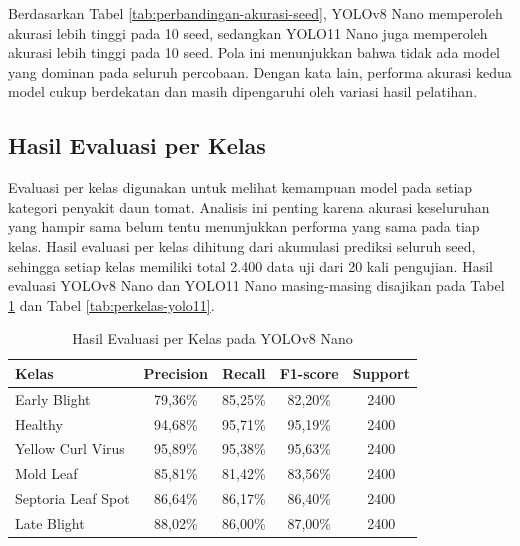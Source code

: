 \begin{sectioncontent}
\begin{subsectioncontent}
        Berdasarkan Tabel \ref{tab:perbandingan-akurasi-seed}, YOLOv8 Nano memperoleh akurasi lebih tinggi pada 10 seed, sedangkan YOLO11 Nano juga memperoleh akurasi lebih tinggi pada 10 seed. Pola ini menunjukkan bahwa tidak ada model yang dominan pada seluruh percobaan. Dengan kata lain, performa akurasi kedua model cukup berdekatan dan masih dipengaruhi oleh variasi hasil pelatihan.
    \end{subsectioncontent}

    \subsection{Hasil Evaluasi per Kelas}
    \begin{subsectioncontent}
        \hspace{\parindent}Evaluasi per kelas digunakan untuk melihat kemampuan model pada setiap kategori penyakit daun tomat. Analisis ini penting karena akurasi keseluruhan yang hampir sama belum tentu menunjukkan performa yang sama pada tiap kelas. Hasil evaluasi per kelas dihitung dari akumulasi prediksi seluruh seed, sehingga setiap kelas memiliki total 2.400 data uji dari 20 kali pengujian. Hasil evaluasi YOLOv8 Nano dan YOLO11 Nano masing-masing disajikan pada Tabel \ref{tab:perkelas-yolov8} dan Tabel \ref{tab:perkelas-yolo11}.

        \begin{table}[H]
            \centering
            \caption{Hasil Evaluasi per Kelas pada YOLOv8 Nano}
            \label{tab:perkelas-yolov8}
            \small
            \begin{tabular}{|l|c|c|c|c|}
                \hline
                \textbf{Kelas} & \textbf{Precision} & \textbf{Recall} & \textbf{F1-score} & \textbf{Support} \\
                \hline
                Early Blight & 79,36\% & 85,25\% & 82,20\% & 2400 \\
                \hline
                Healthy & 94,68\% & 95,71\% & 95,19\% & 2400 \\
                \hline
                Yellow Curl Virus & 95,89\% & 95,38\% & 95,63\% & 2400 \\
                \hline
                Mold Leaf & 85,81\% & 81,42\% & 83,56\% & 2400 \\
                \hline
                Septoria Leaf Spot & 86,64\% & 86,17\% & 86,40\% & 2400 \\
                \hline
                Late Blight & 88,02\% & 86,00\% & 87,00\% & 2400 \\
                \hline
            \end{tabular}
        \end{table}


\end{subsectioncontent}
\end{sectioncontent}
